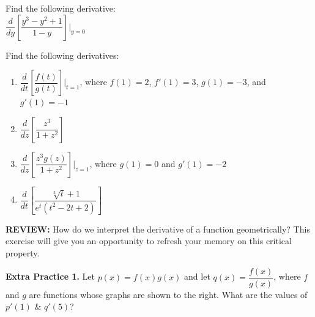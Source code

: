 \documentclass[10pt]{article}
\begin{document}
{} Find the following derivative:\\

$\dfrac{d}{dy}\left[ \dfrac{y^3-y^2+1}{1-y} \right]\bigg|_{y=0}$

\vfill

{} Find the following derivatives:\\

\begin{enumerate}
\item[(a)] $\dfrac{d}{dt}\left[ \dfrac{f(t)}{g(t)} \right]\bigg|_{t=1}$, where $f(1)=2$, $f'(1)=3$, $g(1)=-3$, and $g'(1)=-1$

\vfill

\item[(b)] $\dfrac{d}{dz}\left[ \dfrac{z^3}{1+z^2} \right]$

\vfill

\newpage%

\item[(c)] $\dfrac{d}{dz}\left[ \dfrac{z^3g(z)}{1+z^2} \right]\bigg|_{z=1}$, where $g(1)=0$ and $g'(1)=-2$

\vfill
\vfill

\item[(d)] $\dfrac{d}{dt}\left[ \dfrac{\sqrt[3]{t}+1}{e^t(t^2-2t+2)} \right]$

\vfill
\vfill
\vfill

\end{enumerate}

{\bf REVIEW:} How do we interpret the derivative of a function geometrically? This exercise will give you an opportunity to refresh your memory on this critical property.

\begin{minipage}[t]{0.55\textwidth}
{\bf\color{blue} Extra Practice 1.} %
Let $p(x)=f(x)g(x)$ and let $q(x)=\dfrac{f(x)}{g(x)}$, where $f$ and $g$ are functions whose graphs are shown to the right. What are the values of $p'(1)$ \& $q'(5)$? \\
\end{minipage}
\hfill
\begin{minipage}[t]{0.4\textwidth}
\,
\begin{center}
\end{center}
\end{minipage}
\end{document}
